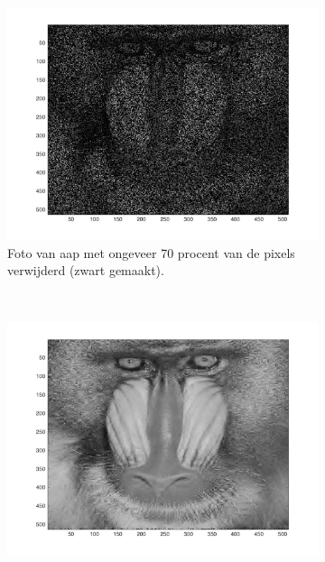 \begin{figure}
\begin{subfigure}[b]{0.45\textwidth}
        \label{fig:matti_fig_1b}
    \end{subfigure}
    \begin{subfigure}[b]{0.45\textwidth}
        \includegraphics[width=\textwidth]{../src/inpainting/baboon_random_noise_1}
        \caption{Foto van aap met ongeveer 70 procent van de pixels verwijderd (zwart gemaakt). }
        \label{fig:matti_fig_1c}
    \end{subfigure}
    ~ %
    \begin{subfigure}[b]{0.45\textwidth}
        \includegraphics[width=\textwidth]{../src/inpainting/baboon_random_fixed_1}

\end{subfigure}
\end{figure}
